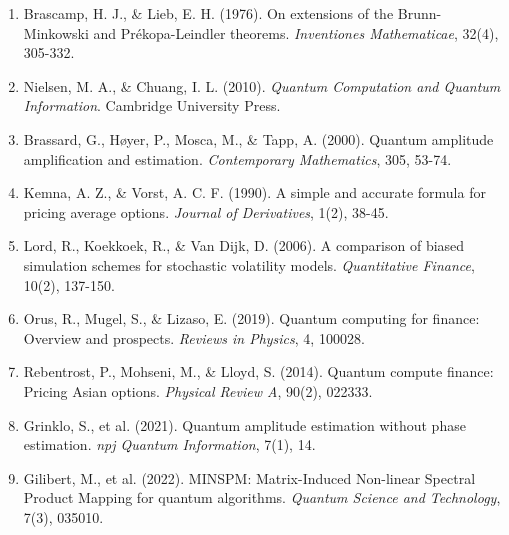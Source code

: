\documentclass[12pt]{article}
\begin{document}
\begin{enumerate}
    \item Brascamp, H. J., \& Lieb, E. H. (1976). On extensions of the Brunn-Minkowski and Pr\'{e}kopa-Leindler theorems. \textit{Inventiones Mathematicae}, 32(4), 305-332.
    
    \item Nielsen, M. A., \& Chuang, I. L. (2010). \textit{Quantum Computation and Quantum Information}. Cambridge University Press.
    
    \item Brassard, G., H\o yer, P., Mosca, M., \& Tapp, A. (2000). Quantum amplitude amplification and estimation. \textit{Contemporary Mathematics}, 305, 53-74.
    
    \item Kemna, A. Z., \& Vorst, A. C. F. (1990). A simple and accurate formula for pricing average options. \textit{Journal of Derivatives}, 1(2), 38-45.
    
    \item Lord, R., Koekkoek, R., \& Van Dijk, D. (2006). A comparison of biased simulation schemes for stochastic volatility models. \textit{Quantitative Finance}, 10(2), 137-150.
    
    \item Orus, R., Mugel, S., \& Lizaso, E. (2019). Quantum computing for finance: Overview and prospects. \textit{Reviews in Physics}, 4, 100028.
    
    \item Rebentrost, P., Mohseni, M., \& Lloyd, S. (2014). Quantum compute finance: Pricing Asian options. \textit{Physical Review A}, 90(2), 022333.
    
    \item Grinklo, S., et al. (2021). Quantum amplitude estimation without phase estimation. \textit{npj Quantum Information}, 7(1), 14.
    
    \item Gilibert, M., et al. (2022). MINSPM: Matrix-Induced Non-linear Spectral Product Mapping for quantum algorithms. \textit{Quantum Science and Technology}, 7(3), 035010.
\end{enumerate}
\end{document}
